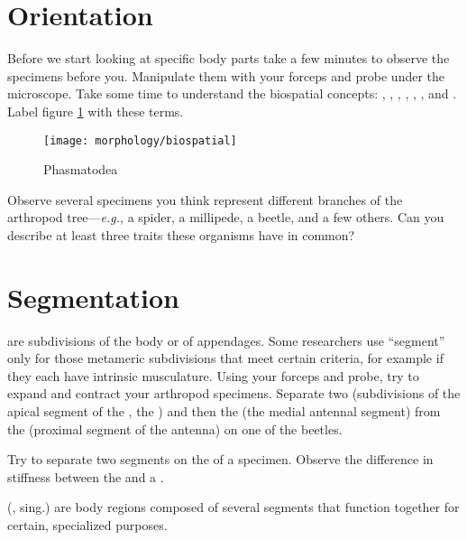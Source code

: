 \section{Orientation}
Before we start looking at specific body parts take a few minutes to observe the specimens before you. Manipulate them with your forceps and probe under the microscope. Take some time to understand the biospatial concepts: , , , , , , and . Label figure \ref{fig:biospatial} with these terms.\vspace{3mm}

\begin{figure}[ht!]
  \centering
    \texttt{[image: morphology/biospatial]}
  \caption{Phasmatodea \citep[][Plate X]{bhlitem104661}}
  \label{fig:biospatial}
\end{figure}

\begin{theo}
{}Observe several specimens you think represent different branches of the arthropod tree---\textit{e.g.}, a spider, a millipede, a beetle, and a few others. Can you describe at least three traits these organisms have in common?
\end{theo}

\section{Segmentation}
 are  subdivisions of the body or of appendages. Some researchers use ``segment'' only for those metameric subdivisions that meet certain criteria, for example if they each have intrinsic musculature. Using your forceps and probe, try to expand and contract your arthropod specimens. Separate two  (subdivisions of the apical segment of the , the ) and then the  (the medial antennal segment) from the  (proximal segment of the antenna) on one of the beetles.\vspace{3mm}

\noindent{}Try to separate two segments on the  of a specimen. Observe the difference in stiffness between the  and a . \vspace{3mm}

\noindent{} (, sing.) are body regions composed of several segments that function together for certain, specialized purposes.\vspace{3mm}

